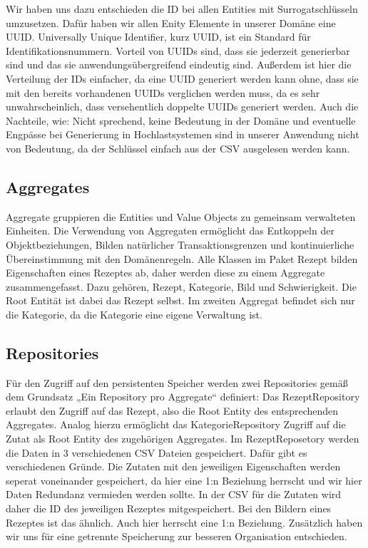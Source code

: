 Wir haben uns dazu entschieden die ID bei allen Entities mit Surrogatschlüsseln umzusetzen. Dafür haben wir allen Enity Elemente in unserer Domäne eine UUID. Universally Unique Identifier, kurz UUID, ist ein Standard für Identifikationsnummern. Vorteil von UUIDs sind, dass sie jederzeit generierbar sind und das sie anwendungsübergreifend eindeutig sind. Außerdem ist hier die Verteilung der IDs einfacher, da eine UUID generiert werden kann ohne, dass sie mit den bereits vorhandenen UUIDs verglichen werden muss, da  es sehr unwahrscheinlich, dass versehentlich doppelte UUIDs generiert werden. Auch die Nachteile, wie: Nicht sprechend, keine Bedeutung in der Domäne und eventuelle Engpässe bei Generierung in
Hochlastsystemen sind in unserer Anwendung nicht von Bedeutung, da der Schlüssel einfach aus der CSV ausgelesen werden kann. 

\subsection{Aggregates}
Aggregate gruppieren die Entities und Value Objects zu gemeinsam verwalteten Einheiten. Die Verwendung von Aggregaten ermöglicht das Entkoppeln der Objektbeziehungen, Bilden natürlicher Transaktionsgrenzen und kontinuierliche Übereinstimmung mit den Domänenregeln. 
Alle Klassen im Paket Rezept bilden Eigenschaften eines Rezeptes ab, daher werden diese zu einem Aggregate zusammengefasst. Dazu gehören, Rezept, Kategorie, Bild und Schwierigkeit. Die Root Entität ist dabei das Rezept selbst. Im zweiten Aggregat befindet sich nur die Kategorie, da die Kategorie eine eigene Verwaltung ist.

\subsection{Repositories}
Für den Zugriff auf den persistenten Speicher werden zwei Repositories gemäß dem Grundsatz „Ein Repository pro Aggregate“ definiert: Das RezeptRepository erlaubt den Zugriff auf das Rezept, also die Root Entity des entsprechenden Aggregates. Analog hierzu ermöglicht das KategorieRepository Zugriff auf die Zutat als Root Entity des zugehörigen Aggregates. Im RezeptReposetory werden die Daten in 3 verschiedenen CSV Dateien gespeichert. Dafür gibt es verschiedenen Gründe. Die Zutaten mit den jeweiligen Eigenschaften werden seperat voneinander gespeichert, da hier eine 1:n Beziehung herrscht und wir hier Daten Redundanz vermieden werden sollte. In der CSV für die Zutaten wird daher die ID des jeweiligen Rezeptes mitgespeichert. Bei den Bildern eines Rezeptes ist das ähnlich. Auch hier herrscht eine 1:n Beziehung. Zusätzlich haben wir uns für eine getrennte Speicherung zur besseren Organisation entschieden.
